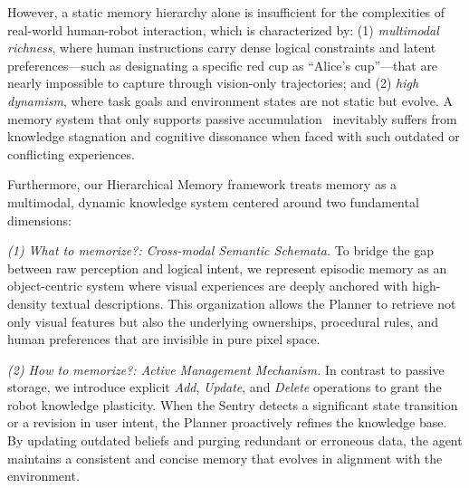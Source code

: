 However, a static memory hierarchy alone is insufficient for the complexities of real-world human-robot interaction, which is characterized by: (1) \textit{multimodal richness}, where human instructions carry dense logical constraints and latent preferences---such as designating a specific red cup as ``Alice's cup''---that are nearly impossible to capture through vision-only trajectories; and (2) \textit{high dynamism}, where task goals and environment states are not static but evolve. A memory system that only supports passive accumulation~\cite{Sridhar2025MemERSU} inevitably suffers from knowledge stagnation and cognitive dissonance when faced with such outdated or conflicting experiences.

Furthermore, our Hierarchical Memory framework treats memory as a multimodal, dynamic knowledge system centered around two fundamental dimensions:

\textit{(1) What to memorize?: Cross-modal Semantic Schemata.} To bridge the gap between raw perception and logical intent, we represent episodic memory as an object-centric system where visual experiences are deeply anchored with high-density textual descriptions. This organization allows the Planner to retrieve not only visual features but also the underlying ownerships, procedural rules, and human preferences that are invisible in pure pixel space.

\textit{(2) How to memorize?: Active Management Mechanism.} In contrast to passive storage, we introduce explicit \textit{Add}, \textit{Update}, and \textit{Delete} operations to grant the robot knowledge plasticity. When the Sentry detects a significant state transition or a revision in user intent, the Planner proactively refines the knowledge base. By updating outdated beliefs and purging redundant or erroneous data, the agent maintains a consistent and concise memory that evolves in alignment with the environment.






